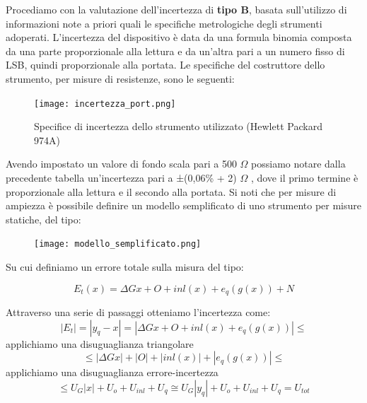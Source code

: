 Procediamo con la valutazione dell'incertezza di \textbf{tipo B}, basata sull'utilizzo di informazioni note a priori quali le specifiche metrologiche degli strumenti adoperati. L’incertezza del dispositivo è data da una formula binomia composta da una parte proporzionale alla lettura e da un’altra pari a un numero fisso di LSB, quindi 
 proporzionale alla portata. Le specifiche del costruttore dello strumento, per misure di resistenze, sono le seguenti:

\begin{figure}[h]
    \centering
    \texttt{[image: incertezza\_port.png]}
    \caption{Specifice di incertezza dello strumento utilizzato (Hewlett Packard 974A)}
    \label{fig:Incertezza_multimetro_port}
\end{figure}
\FloatBarrier

Avendo impostato un valore di fondo scala pari a 500 $\Omega$ possiamo notare dalla precedente tabella un’incertezza pari a ±(0,06\% + 2) $\Omega$ , dove il primo termine è proporzionale alla lettura e il secondo alla portata. Si noti che per misure di ampiezza è possibile definire un modello semplificato di uno strumento per misure statiche, del tipo:

\begin{figure}[h]
    \centering
    \texttt{[image: modello\_semplificato.png]}
    \label{fig:modello}
\end{figure}
\FloatBarrier

Su cui definiamo un errore totale sulla misura del tipo:

\begin{equation}
    E_t(x) = \Delta Gx + O + inl(x) + e_q(g(x)) + N
\end{equation}


Attraverso una serie di passaggi otteniamo l'incertezza come:
\begin{equation}
    |E_t| = |y_q - x| = | \Delta Gx + O + inl(x) + e_q(g(x)) | \leq 
\end{equation}
applichiamo una disuguaglianza triangolare
\begin{equation*}
    \leq | \Delta Gx | + | O | + | inl(x) | + | e_q(g(x)) | \leq 
\end{equation*}
applichiamo una disuguaglianza errore-incertezza
\begin{equation*}
    \leq U_G|x| + U_o + U_{inl} + U_q \cong U_G|y_q| + U_o + U_{inl} +U_q = U_{tot}
\end{equation*}

